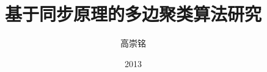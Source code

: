 \documentclass[bachelor]{uestcthesis}
\title{基于同步原理的多边聚类算法研究}
\author{高崇铭}
\date{2013}{4}{15}
\begin{document}
\newcommand{\red}[1]{{\textcolor{red}{{} #1}}}
\newcommand{\ud}{\,\mathrm{d}}
\newcommand{\bt}{\vrule width 0.85pt}
\newcommand{\CoSync}{CoSync}
\newcommand{\Sync}{Sync}
\newcommand{\cosync}{CoSync}
\newcommand{\sync}{Sync}
\makeatletter
\def\hlinew#1{%
  \noalign{\ifnum0=`}\fi\hrule \@height #1 \futurelet
   \reserved@a\@xhline}






\end{document}
